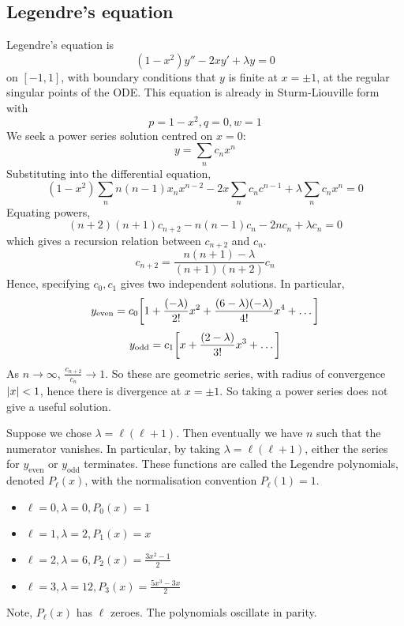\subsection{Legendre's equation}
Legendre's equation is
\[
	(1-x^2)y'' - 2xy' + \lambda y = 0
\]
on \( [-1,1] \), with boundary conditions that \( y \) is finite at \( x = \pm 1 \), at the regular singular points of the ODE.\@
This equation is already in Sturm-Liouville form with
\[
	p=1-x^2, q=0, w=1
\]
We seek a power series solution centred on \( x = 0 \):
\[
	y = \sum_n c_n x^n
\]
Substituting into the differential equation,
\[
	(1-x^2) \sum_n n(n-1) x_n x^{n-2} - 2x \sum_n c_n c^{n-1} + \lambda \sum_n c_n x^n = 0
\]
Equating powers,
\[
	(n+2)(n+1)c_{n+2} - n(n-1)c_n - 2n c_n + \lambda c_n = 0
\]
which gives a recursion relation between \( c_{n+2} \) and \( c_n \).
\[
	c_{n+2} = \frac{n(n+1) - \lambda}{(n+1)(n+2)} c_n
\]
Hence, specifying \( c_0, c_1 \) gives two independent solutions.
In particular,
\[
	y_{\text{even}} = c_0 \qty[1 + \frac{(-\lambda)}{2!}x^2 + \frac{(6-\lambda)(-\lambda)}{4!} x^4 + \dots]
\]
\[
	y_{\text{odd}} = c_1 \qty[x + \frac{(2-\lambda)}{3!}x^3 + \dots]
\]
As \( n \to \infty \), \( \frac{c_{n+2}}{c_n} \to 1 \).
So these are geometric series, with radius of convergence \( \abs{x} < 1 \), hence there is divergence at \( x = \pm 1 \).
So taking a power series does not give a useful solution.

Suppose we chose \( \lambda = \ell (\ell + 1) \).
Then eventually we have \( n \) such that the numerator vanishes.
In particular, by taking \( \lambda = \ell (\ell + 1) \), either the series for \( y_{\text{even}} \) or \( y_{\text{odd}} \) terminates.
These functions are called the Legendre polynomials, denoted \( P_\ell(x) \), with the normalisation convention \( P_\ell(1) = 1 \).
\begin{itemize}
	\item \( \ell = 0, \lambda = 0, P_0(x) = 1 \)
	\item \( \ell = 1, \lambda = 2, P_1(x) = x \)
	\item \( \ell = 2, \lambda = 6, P_2(x) = \frac{3x^2 - 1}{2} \)
	\item \( \ell = 3, \lambda = 12, P_3(x) = \frac{5x^3 - 3x}{2} \)
\end{itemize}
Note, \( P_\ell(x) \) has \( \ell \) zeroes.
The polynomials oscillate in parity.


